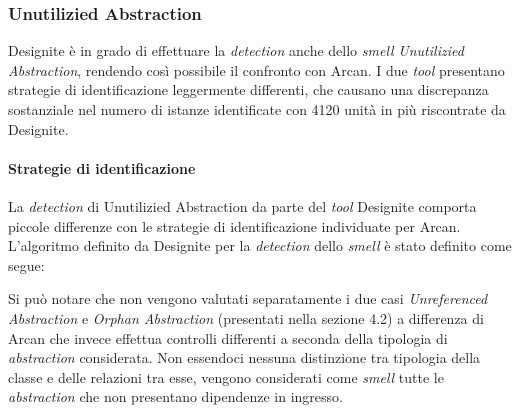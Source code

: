 
\subsubsection{Unutilizied Abstraction}
    Designite è in grado di effettuare la \textit{detection} anche dello \textit{smell} \textit{Unutilizied Abstraction}, rendendo così possibile il confronto con Arcan. I due \textit{tool} presentano strategie di identificazione leggermente differenti, che causano una discrepanza sostanziale nel numero di istanze identificate con 4120 unità in più riscontrate da Designite.

    \paragraph{Strategie di identificazione}
        La \textit{detection} di Unutilizied Abstraction da parte del \textit{tool} Designite comporta piccole differenze con le strategie di identificazione individuate per Arcan. L'algoritmo definito da Designite per la \textit{detection} dello \textit{smell} è stato definito come segue:
        \begin{algorithmic}
                \Else {}
                    \EndIf
                \EndIf \EndIf
            \EndFunction
        \end{algorithmic}
        Si può notare che non vengono valutati separatamente i due casi \textit{Unreferenced Abstraction} e \textit{Orphan Abstraction} (presentati nella sezione 4.2) a differenza di Arcan che invece effettua controlli differenti a seconda della tipologia di \textit{abstraction} considerata.
        Non essendoci nessuna distinzione tra tipologia della classe e delle relazioni tra esse, vengono considerati come \textit{smell} tutte le \textit{abstraction} che non presentano dipendenze in ingresso. 
            
